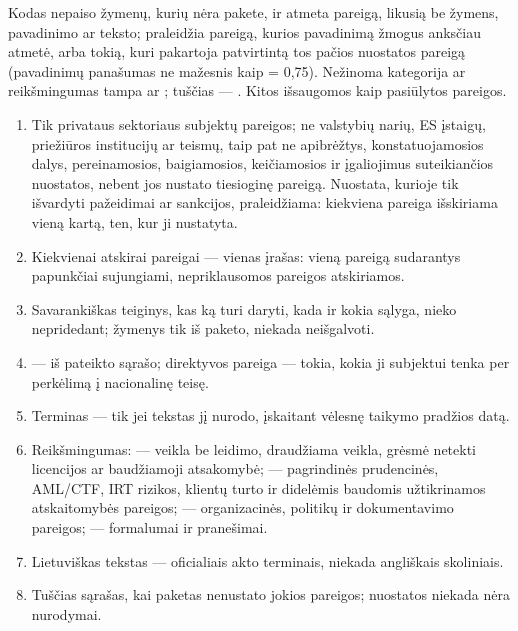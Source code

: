 Kodas nepaiso žymenų, kurių nėra pakete, ir atmeta pareigą, likusią be žymens, pavadinimo ar
teksto; praleidžia pareigą, kurios pavadinimą žmogus anksčiau atmetė, arba tokią, kuri pakartoja
patvirtintą tos pačios nuostatos pareigą (pavadinimų panašumas ne mažesnis kaip
 = 0,75). Nežinoma kategorija ar reikšmingumas tampa  ar
; tuščias  --- . Kitos išsaugomos kaip pasiūlytos
pareigos.

\begin{enumerate}[itemsep=1pt, topsep=3pt]
  \item Tik privataus sektoriaus subjektų pareigos; ne valstybių narių, ES įstaigų, priežiūros
    institucijų ar teismų, taip pat ne apibrėžtys, konstatuojamosios dalys, pereinamosios,
    baigiamosios, keičiamosios ir įgaliojimus suteikiančios nuostatos, nebent jos nustato
    tiesioginę pareigą. Nuostata, kurioje tik išvardyti pažeidimai ar sankcijos, praleidžiama:
    kiekviena pareiga išskiriama vieną kartą, ten, kur ji nustatyta.
  \item Kiekvienai atskirai pareigai --- vienas įrašas: vieną pareigą sudarantys papunkčiai
    sujungiami, nepriklausomos pareigos atskiriamos.
  \item Savarankiškas teiginys, kas ką turi daryti, kada ir kokia sąlyga, nieko nepridedant;
    žymenys tik iš paketo, niekada neišgalvoti.
  \item {} --- iš pateikto sąrašo; direktyvos pareiga --- tokia, kokia ji
    subjektui tenka per perkėlimą į nacionalinę teisę.
  \item Terminas --- tik jei tekstas jį nurodo, įskaitant vėlesnę taikymo pradžios datą.
  \item Reikšmingumas:  --- veikla be leidimo, draudžiama veikla, grėsmė netekti
    licencijos ar baudžiamoji atsakomybė;  --- pagrindinės prudencinės, AML/CTF, IRT
    rizikos, klientų turto ir didelėmis baudomis užtikrinamos atskaitomybės pareigos;
     --- organizacinės, politikų ir dokumentavimo pareigos;  ---
    formalumai ir pranešimai.
  \item Lietuviškas tekstas --- oficialiais akto terminais, niekada angliškais skoliniais.
  \item Tuščias sąrašas, kai paketas nenustato jokios pareigos; nuostatos niekada nėra
    nurodymai.
\end{enumerate}

